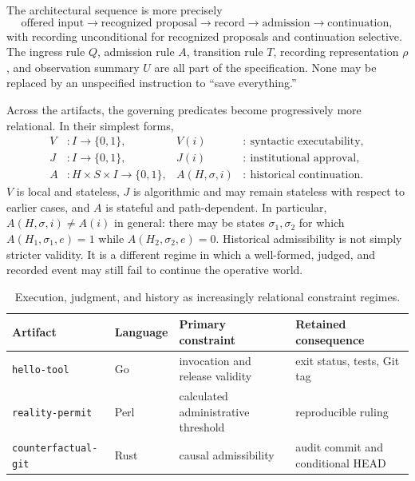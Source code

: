 \documentclass[11pt]{article}
\begin{document}
The architectural sequence is more precisely
\begin{equation}
  \boxed{\text{offered input}\longrightarrow\text{recognized proposal}
  \longrightarrow\text{record}\longrightarrow\text{admission}
  \longrightarrow\text{continuation}},
  \label{eq:central-sequence}
\end{equation}
with recording unconditional for recognized proposals and continuation selective. The ingress rule $Q$, admission rule $A$, transition rule $T$, recording representation $\rho$, and observation summary $U$ are all part of the specification. None may be replaced by an unspecified instruction to ``save everything.''

Across the artifacts, the governing predicates become progressively more relational. In their simplest forms,
\begin{align}
  V &: I\to\{0,1\}, & V(i)&:\ \text{syntactic executability},\\
  J &: I\to\{0,1\}, & J(i)&:\ \text{institutional approval},\\
  A &: H\times S\times I\to\{0,1\}, & A(H,\sigma,i)&:\ \text{historical continuation}.
  \label{eq:vja}
\end{align}
$V$ is local and stateless, $J$ is algorithmic and may remain stateless with respect to earlier cases, and $A$ is stateful and path-dependent. In particular, $A(H,\sigma,i)\neq A(i)$ in general: there may be states $\sigma_1,\sigma_2$ for which $A(H_1,\sigma_1,e)=1$ while $A(H_2,\sigma_2,e)=0$. Historical admissibility is not simply stricter validity. It is a different regime in which a well-formed, judged, and recorded event may still fail to continue the operative world.

\begin{table}[ht]
\centering
\footnotesize
\setlength{\tabcolsep}{4pt}
\begin{tabular}{@{}>{\raggedright\arraybackslash}p{}>{\raggedright\arraybackslash}p{}>{\raggedright\arraybackslash}p{}>{\raggedright\arraybackslash}p{}@{}}
\toprule
\textbf{Artifact} & \textbf{Language} & \textbf{Primary constraint} & \textbf{Retained consequence} \\
\midrule
\texttt{hello-tool} & Go & invocation and release validity & exit status, tests, Git tag \\
\texttt{reality-permit} & Perl & calculated administrative threshold & reproducible ruling \\
\texttt{counterfactual-git} & Rust & causal admissibility & audit commit and conditional HEAD \\
\bottomrule
\end{tabular}
\caption{Execution, judgment, and history as increasingly relational constraint regimes.}
\label{tab:comparison}
\end{table}
\end{document}
